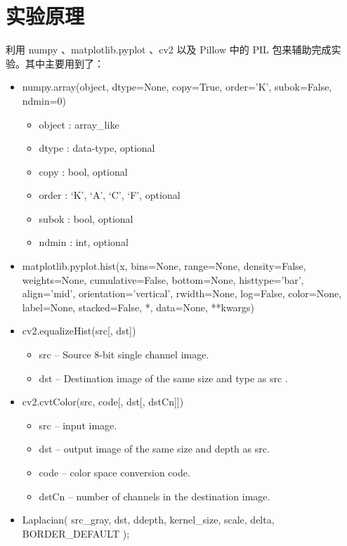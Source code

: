\documentclass[11pt]{ctexart}
\begin{document}
\section{实验原理}

利用 numpy 、matplotlib.pyplot 、cv2 以及 Pillow 中的 PIL 包来辅助完成实验。其中主要用到了：

\begin{itemize}
    \item numpy.array(object, dtype=None, copy=True, order='K', subok=False, ndmin=0)
    \begin{itemize}
        \item object : array\_like
        \item dtype : data-type, optional
        \item copy : bool, optional
        \item order : {‘K’, ‘A’, ‘C’, ‘F’}, optional
        \item subok : bool, optional
        \item ndmin : int, optional
    \end{itemize}
    \item matplotlib.pyplot.hist(x, bins=None, range=None, density=False, weights=None, cumulative=False, bottom=None, histtype='bar', align='mid', orientation='vertical', rwidth=None, log=False, color=None, label=None, stacked=False, *, data=None, **kwargs)
    \item cv2.equalizeHist(src[, dst])
    \begin{itemize}
        \item src – Source 8-bit single channel image.
        \item dst – Destination image of the same size and type as src .
    \end{itemize}
    \item cv2.cvtColor(src, code[, dst[, dstCn]]) 
    \begin{itemize}
        \item src – input image.
        \item dst – output image of the same size and depth as src.
        \item code – color space conversion code.
        \item dstCn – number of channels in the destination image.
    \end{itemize}
    \item Laplacian( src\_gray, dst, ddepth, kernel\_size, scale, delta, BORDER\_DEFAULT );
    \begin{itemize}

\end{itemize}
\end{itemize}
\end{document}
